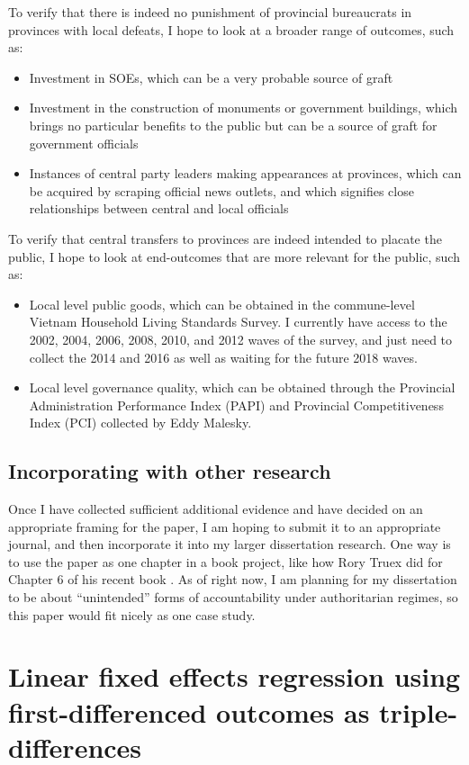 \documentclass[12pt]{article}\usepackage[]{graphicx}\usepackage[]{color}
\newcommand{\1}{\mathbbm{1}}
\begin{document}
To verify that there is indeed no punishment of provincial bureaucrats in provinces with local defeats, I hope to look at a broader range of outcomes, such as:
\begin{itemize}
	\item Investment in SOEs, which can be a very probable source of graft
	\item Investment in the construction of monuments or government buildings, which brings no particular benefits to the public but can be a source of graft for government officials
	\item Instances of central party leaders making appearances at provinces, which can be acquired by scraping official news outlets, and which signifies close relationships between central and local officials	
\end{itemize}

To verify that central transfers to provinces are indeed intended to placate the public, I hope to look at end-outcomes that are more relevant for the public, such as:
\begin{itemize}
	\item Local level public goods, which can be obtained in the commune-level Vietnam Household Living Standards Survey. I currently have access to the 2002, 2004, 2006, 2008, 2010, and 2012 waves of the survey, and just need to collect the 2014 and 2016 as well as waiting for the future 2018 waves.
	\item Local level governance quality, which can be obtained through the Provincial Administration Performance Index (PAPI) and Provincial Competitiveness Index (PCI) collected by Eddy Malesky.
\end{itemize}

\subsection{Incorporating with other research}
Once I have collected sufficient additional evidence and have decided on an appropriate framing for the paper, I am hoping to submit it to an appropriate journal, and then incorporate it into my larger dissertation research. One way is to use the paper as one chapter in a book project, like how Rory Truex did for Chapter 6 of his recent book \citeyearpar{Truex2016}. As of right now, I am planning for my dissertation to be about ``unintended'' forms of accountability under authoritarian regimes, so this paper would fit nicely as one case study.

\newpage
\section{Linear fixed effects regression using first-differenced outcomes as triple-differences}
\label{app:proof1}
\end{document}
